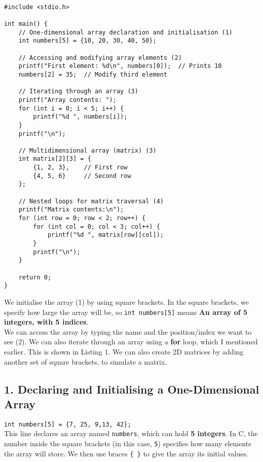 \documentclass[a4paper,12pt]{article}
\begin{document}
\lstset{language=C}
\begin{lstlisting}[caption=Array and Matrix Operations]

#include <stdio.h>

int main() {
    // One-dimensional array declaration and initialisation (1)
    int numbers[5] = {10, 20, 30, 40, 50};
    
    // Accessing and modifying array elements (2)
    printf("First element: %d\n", numbers[0]);  // Prints 10
    numbers[2] = 35;  // Modify third element
    
    // Iterating through an array (3)
    printf("Array contents: ");
    for (int i = 0; i < 5; i++) {
        printf("%d ", numbers[i]);
    }
    printf("\n");
    
    // Multidimensional array (matrix) (3)
    int matrix[2][3] = {
        {1, 2, 3},    // First row
        {4, 5, 6}     // Second row
    };
    
    // Nested loops for matrix traversal (4)
    printf("Matrix contents:\n");
    for (int row = 0; row < 2; row++) {
        for (int col = 0; col < 3; col++) {
            printf("%d ", matrix[row][col]);
        }
        printf("\n");
    }
    
    return 0;
}
\end{lstlisting}

We initialise the array (1) by using square brackets. In the square brackets, we specify how large the array will be, so \verb|int numbers[5]| means \textbf{An array of 5 integers, with 5 indices}.\\

We can access the array by typing the name and the position/index we want to see (2). We can also iterate through an array using a \textbf{for} loop, which I mentioned earlier. This is shown in Listing 1. We can also create 2D matrices by adding another set of square brackets, to simulate a matrix.

\subsection{1. Declaring and Initialising a One-Dimensional Array}
\verb|int numbers[5] = {7, 25, 9,13, 42};|\\[6pt]
This line declares an array named \verb|numbers|, which can hold \textbf{5 integers}. In C, the number inside the square brackets (in this case, \verb|5|) specifies how many elements the array will store. We then use braces \verb|{ }| to give the array its initial values. 
\end{document}

